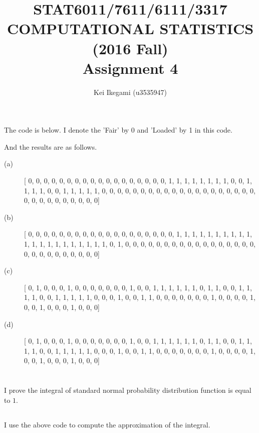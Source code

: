 \documentclass{article}
\begin{document}
\title{STAT6011/7611/6111/3317 \\ 
COMPUTATIONAL STATISTICS (2016 Fall) \\
Assignment 4}
\author{Kei Ikegami (u3535947)}
\maketitle

\section{}
The code is below. I denote the 'Fair' by 0 and 'Loaded' by 1 in this code.
	
And the results are as follows.
\begin{description}
	\item[(a)] [ 0,  0,  0,  0,  0,  0,  0,  0,  0,  0,  0,  0,  0,
      	0,  0,  0,  0,  0,  1,  1,  1,  1,  1,  1,  1,  1,
        0,  0,  1,  1,  1,  1,  0,  0,  1,  1,  1,  1,  1,
        0,  0,  0,  0,  0,  0,  0,  0,  0,  0,  0,  0,  0,
        0,  0,  0,  0,  0,  0,  0,  0,  0,  0,  0,  0,  0,
        0,  0,  0,  0]
	\item[(b)] [ 0,  0,  0,  0,  0,  0,  0,  0,  0,  0,  0,  0,  0,
        0,  0,  0,  0,  0,  0,  1,  1,  1,  1,  1,  1,  1,
        1,  1,  1,  1,  1,  1,  1,  1,  1,  1,  1,  1,  1,
        1,  0,  1,  0,  0,  0,  0,  0,  0,  0,  0,  0,  0,
        0,  0,  0,  0,  0,  0,  0,  0,  0,  0,  0,  0,  0,
        0,  0,  0,  0]
	\item[(c)] [ 0,  1,  0,  0,  0,  1,  0,  0,  0,  0,  0,  0,  0,
        1,  0,  0,  1,  1,  1,  1,  1,  1,  0,  1,  1,  0,
        0,  1,  1,  1,  1,  0,  0,  1,  1,  1,  1,  1,  0,
        0,  0,  1,  0,  0,  1,  1,  0,  0,  0,  0,  0,  0,
        0,  1,  0,  0,  0,  0,  1,  0,  0,  1,  0,  0,  0,
        1,  0,  0,  0]
	\item[(d)] [ 0,  1,  0,  0,  0,  1,  0,  0,  0,  0,  0,  0,  0,
        1,  0,  0,  1,  1,  1,  1,  1,  1,  0,  1,  1,  0,
        0,  1,  1,  1,  1,  0,  0,  1,  1,  1,  1,  1,  0,
        0,  0,  1,  0,  0,  1,  1,  0,  0,  0,  0,  0,  0,
        0,  1,  0,  0,  0,  0,  1,  0,  0,  1,  0,  0,  0,
        1,  0,  0,  0]
\end{description}
\section{}
	
	\subsection{}
	 	I prove the integral of standard normal probability distribution function is equal to $1$.
	\subsection{}
		I use the above code to compute the approximation of the integral.
\section{}
	
\section{}
	
\section{}
	
\end{document}
